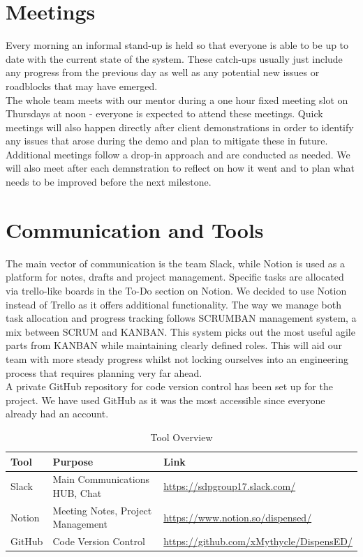 \documentclass[a4paper,10pt,DIV10,openright,openbib]{scrreprt}
\let\oldbibliography%
\renewcommand{}[1]{{%
  \let\chapter\section%
  \oldbibliography{#1}}}%
\begin{document}
\section{Meetings}
Every morning an informal stand-up is held so that everyone is able to be up to
date with the current state of the system. These catch-ups usually just include
any progress from the previous day as well as any potential new issues or roadblocks
that may have emerged.\\
The whole team meets with our mentor during a one hour fixed meeting slot on
Thursdays at noon - everyone is expected to attend these meetings. Quick
meetings will also happen directly after client demonstrations in order to
identify any issues that arose during the demo and plan to mitigate these in future.
Additional meetings follow a drop-in approach and are conducted as needed.
We will also meet after each demnstration to reflect on how it went and to plan
what needs to be improved before the next milestone.


\section{Communication and Tools}
The main vector of communication is the team Slack, while Notion is used as a platform for notes,
drafts and project management. Specific tasks are allocated via trello-like boards in
the To-Do section on Notion. We decided to use Notion instead of Trello as it
offers additional functionality. The way we manage both task allocation and
progress tracking follows SCRUMBAN management system, a mix between SCRUM
and KANBAN. This system picks out the most useful agile parts from KANBAN while
maintaining clearly defined roles. This will aid our team with more
steady progress whilst not locking ourselves into an engineering process that
requires planning very far ahead. \\
A private GitHub repository for code version control has been set
up for the project. We have used GitHub as it was the most accessible since
everyone already had an account.\\
\begin{table}[h]
\centering
\caption{Tool Overview}
\begin{tabular}{@{}lll@{}}
\toprule
Tool   & Purpose                                   & Link     \\ \midrule
Slack  & Main Communications HUB, Chat             & \url{https://sdpgroup17.slack.com/} \\
Notion & Meeting Notes, Project Management & \url{https://www.notion.so/dispensed/} \\
GitHub & Code Version Control                      & \url{https://github.com/xMythycle/DispensED/} \\ \bottomrule
\end{tabular}
\end{table}




%




\end{document}
